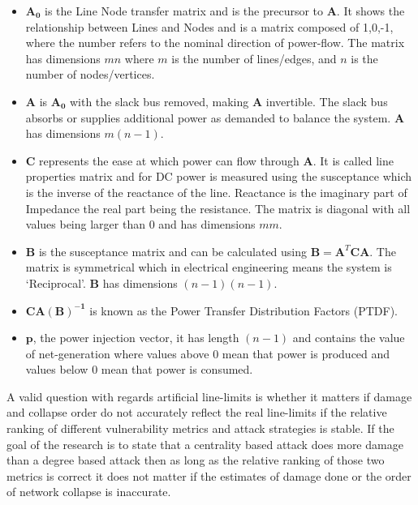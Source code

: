 \begin{itemize}
    \item $\mathbf{A_0}$ is the Line Node transfer matrix and is the precursor to $\mathbf{A}$.  It shows the relationship between Lines and Nodes and is a matrix composed of 1,0,-1, where the number refers to the nominal direction of power-flow. The matrix has dimensions $mn$ where $m$ is the number of lines/edges, and $n$ is the number of nodes/vertices.

\item $\mathbf{A}$ is $\mathbf{A_0}$ with the slack bus removed, making $\mathbf{A}$ invertible. The slack bus absorbs or supplies additional power as demanded to balance the system. $\mathbf{A}$ has dimensions $m(n-1)$.

\item $\mathbf{C}$ represents the ease at which power can flow through $\mathbf{A}$. It is called line properties matrix and for DC power is measured using the susceptance which is the inverse of the reactance of the line. Reactance is the imaginary part of Impedance the real part being the resistance. The matrix is diagonal with all values being larger than 0 and has dimensions $mm$. 

\item $\mathbf{B}$ is the susceptance matrix and can be calculated using $\mathbf{B} = \mathbf{A}^T\mathbf{C}\mathbf{A}$. The matrix is symmetrical which in electrical engineering means the system is `Reciprocal'. $\mathbf{B}$ has dimensions $(n-1)(n-1)$.

\item $\mathbf{CA(B)^{-1}}$ is known as the Power Transfer Distribution Factors (PTDF).

\item $\mathbf{p}$, the power injection vector, it has length $(n-1)$ and contains the value of net-generation where values above 0 mean that power is produced and values below 0 mean that power is consumed.

\end{itemize}




A valid question with regards artificial line-limits is whether it matters if damage and collapse order do not accurately reflect the real line-limits if the relative ranking of different vulnerability metrics and attack strategies is stable. If the goal of the research is to state that a centrality based attack does more damage than a degree based attack then as long as the relative ranking of those two metrics is correct it does not matter if the estimates of damage done or the order of network collapse is inaccurate.